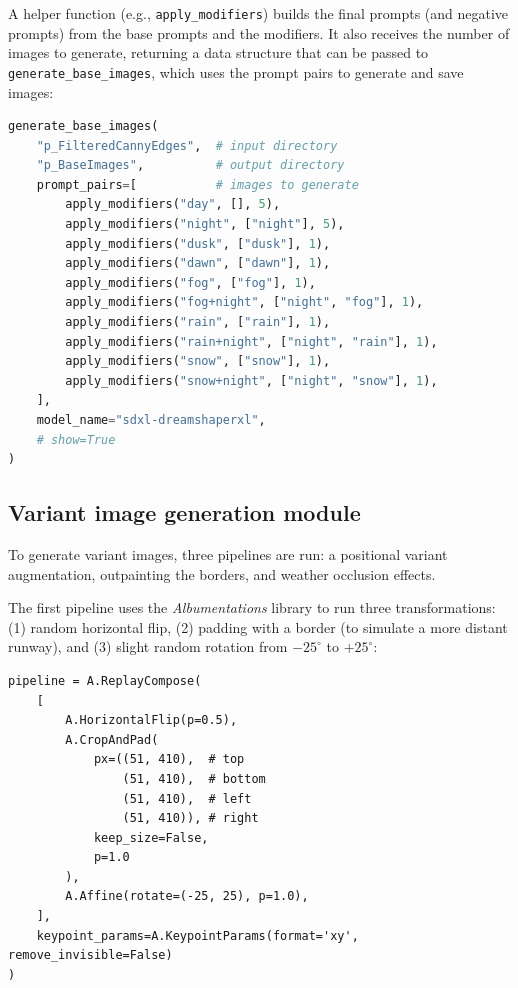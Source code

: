A helper function (e.g., \texttt{apply\_modifiers}) builds the final prompts
(and negative prompts) from the base prompts and the modifiers. 
It also receives the number of images to generate, returning a data structure that can be passed to \texttt{generate\_base\_images}, which uses the prompt pairs to generate and save images:

\begin{lstlisting}[language=Python, caption={Base Image generation module,
generating base images}]
generate_base_images(
    "p_FilteredCannyEdges",  # input directory
    "p_BaseImages",          # output directory
    prompt_pairs=[           # images to generate
        apply_modifiers("day", [], 5),
        apply_modifiers("night", ["night"], 5),
        apply_modifiers("dusk", ["dusk"], 1),
        apply_modifiers("dawn", ["dawn"], 1),
        apply_modifiers("fog", ["fog"], 1),
        apply_modifiers("fog+night", ["night", "fog"], 1),
        apply_modifiers("rain", ["rain"], 1),
        apply_modifiers("rain+night", ["night", "rain"], 1),
        apply_modifiers("snow", ["snow"], 1),
        apply_modifiers("snow+night", ["night", "snow"], 1),
    ],
    model_name="sdxl-dreamshaperxl",
    # show=True
)
\end{lstlisting}

\subsection{Variant image generation module}

To generate variant images, three pipelines are run: a positional variant augmentation, outpainting the borders, and weather occlusion effects.

The first pipeline uses the \emph{Albumentations} library \cite{buslaev_albumentations_2020} to run three transformations: 
(1) random horizontal flip, 
(2) padding with a border (to simulate a more distant runway), and 
(3) slight random rotation from $-25^\circ$ to $+25^\circ$:

\begin{lstlisting}
pipeline = A.ReplayCompose(
    [
        A.HorizontalFlip(p=0.5),
        A.CropAndPad(
            px=((51, 410),  # top
                (51, 410),  # bottom
                (51, 410),  # left
                (51, 410)), # right
            keep_size=False,
            p=1.0
        ),
        A.Affine(rotate=(-25, 25), p=1.0),
    ],
    keypoint_params=A.KeypointParams(format='xy', remove_invisible=False)
)
\end{lstlisting}

